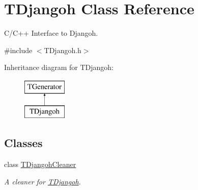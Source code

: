 \hypertarget{class_t_djangoh}{}\section{T\+Djangoh Class Reference}
\label{class_t_djangoh}


C/\+C++ Interface to Djangoh.  




{\ttfamily \#include $<$T\+Djangoh.\+h$>$}

Inheritance diagram for T\+Djangoh\+:\begin{figure}[H]
\begin{center}
\leavevmode
\includegraphics[height=2.000000cm]{class_t_djangoh}
\end{center}
\end{figure}
\subsection*{Classes}
\begin{DoxyCompactItemize}
\item 
class \hyperlink{class_t_djangoh_1_1_t_djangoh_cleaner}{T\+Djangoh\+Cleaner}
\begin{DoxyCompactList}\small\item\em A cleaner for \hyperlink{class_t_djangoh}{T\+Djangoh}. \end{DoxyCompactList}\end{DoxyCompactItemize}
